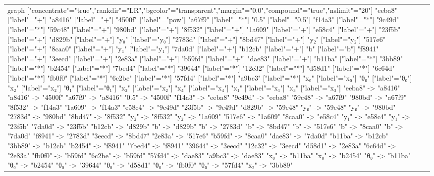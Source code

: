 \documentclass[11pt]{article}
\begin{document}
\begin{table}[H]
\begin{tabular}{lcc}
\begin{adjustbox}{minipage={.25\textwidth}, height=0.14\textwidth, margin*=0cm 0cm 0cm 0.1cm}
{    graph ["concentrate"="true","rankdir"="LR","bgcolor"="transparent","margin"="0.0","compound"="true","nslimit"="20"]
    "eeba8" ["label"="+"]
    "a8416" ["label"="+"]
    "4500f" ["label"="pow"]
    "a67f9" ["label"="*"]
    "0.5" ["label"="0.5"]
    "f14a3" ["label"="*"]
    "9c49d" ["label"="*"]
    "59c48" ["label"="+"]
    "980bd" ["label"="+"]
    "8f532" ["label"="+"]
    "1a609" ["label"="+"]
    "e58c4" ["label"="+"]
    "23f5b" ["label"="+"]
    "d829b" ["label"="+"]
    "y₀" ["label"="y₀"]
    "2783d" ["label"="+"]
    "8bd47" ["label"="+"]
    "y₂" ["label"="y₂"]
    "517e6" ["label"="+"]
    "8caa0" ["label"="+"]
    "y₁" ["label"="y₁"]
    "7da0d" ["label"="+"]
    "b12cb" ["label"="+"]
    "b" ["label"="b"]
    "f8941" ["label"="+"]
    "3eecd" ["label"="+"]
    "2e83a" ["label"="+"]
    "b59fd" ["label"="+"]
    "dae83" ["label"="+"]
    "b11ba" ["label"="*"]
    "3bb89" ["label"="*"]
    "b2454" ["label"="*"]
    "7bed4" ["label"="*"]
    "39644" ["label"="*"]
    "12c32" ["label"="*"]
    "d58d1" ["label"="*"]
    "6c64d" ["label"="*"]
    "fb0f0" ["label"="*"]
    "6c2be" ["label"="*"]
    "57fd4" ["label"="*"]
    "a9bc3" ["label"="*"]
    "x₀" ["label"="x₀"]
    "θ₀" ["label"="θ₀"]
    "x₂" ["label"="x₂"]
    "θ₁" ["label"="θ₁"]
    "x₂" ["label"="x₂"]
    "x₄" ["label"="x₄"]
    "x₁" ["label"="x₁"]
    "x₃" ["label"="x₃"]
    "eeba8" -> "a8416"
    "a8416" -> "4500f"
    "a67f9" -> "a8416"
    "0.5" -> "4500f"
    "f14a3" -> "eeba8"
    "9c49d" -> "eeba8"
    "59c48" -> "a67f9"
    "980bd" -> "a67f9"
    "8f532" -> "f14a3"
    "1a609" -> "f14a3"
    "e58c4" -> "9c49d"
    "23f5b" -> "9c49d"
    "d829b" -> "59c48"
    "y₀" -> "59c48"
    "y₀" -> "980bd"
    "2783d" -> "980bd"
    "8bd47" -> "8f532"
    "y₂" -> "8f532"
    "y₂" -> "1a609"
    "517e6" -> "1a609"
    "8caa0" -> "e58c4"
    "y₁" -> "e58c4"
    "y₁" -> "23f5b"
    "7da0d" -> "23f5b"
    "b12cb" -> "d829b"
    "b" -> "d829b"
    "b" -> "2783d"
    "b" -> "8bd47"
    "b" -> "517e6"
    "b" -> "8caa0"
    "b" -> "7da0d"
    "f8941" -> "2783d"
    "3eecd" -> "8bd47"
    "2e83a" -> "517e6"
    "b59fd" -> "8caa0"
    "dae83" -> "7da0d"
    "b11ba" -> "b12cb"
    "3bb89" -> "b12cb"
    "b2454" -> "f8941"
    "7bed4" -> "f8941"
    "39644" -> "3eecd"
    "12c32" -> "3eecd"
    "d58d1" -> "2e83a"
    "6c64d" -> "2e83a"
    "fb0f0" -> "b59fd"
    "6c2be" -> "b59fd"
    "57fd4" -> "dae83"
    "a9bc3" -> "dae83"
    "x₀" -> "b11ba"
    "x₀" -> "b2454"
    "θ₀" -> "b11ba"
    "θ₀" -> "b2454"
    "θ₀" -> "39644"
    "θ₀" -> "d58d1"
    "θ₀" -> "fb0f0"
    "θ₀" -> "57fd4"
    "x₂" -> "3bb89"
}
\end{adjustbox}
\end{tabular}
\end{table}
\end{document}
